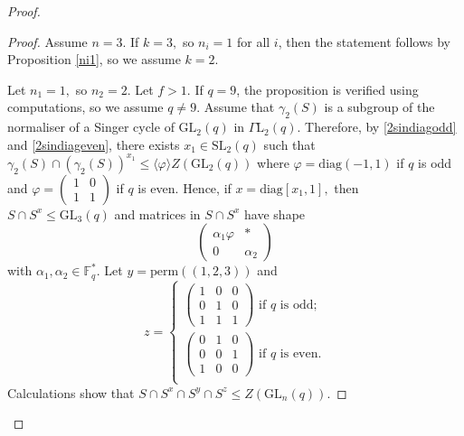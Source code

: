 \documentclass[a4paper,reqno,11pt]{amsart}
\theoremstyle{definition}
\theoremstyle{remark}
\numberwithin{equation}{section}
\newcommand{\diag}{\mathrm{diag}}
\newcommand{\per}{\mathrm{perm}}
\newcommand{\GaL}{{\Gamma \mathrm{L}}}
\newcommand{\SL}{{\mathrm{SL}}}
\newcommand{\GL}{{\mathrm{GL}}}
\begin{document}
\begin{proof}
\begin{proof}
Assume $n=3$.  If $k=3,$ so $n_i=1$ for all $i$, then the statement follows by Proposition \ref{ni1}, so we assume $k=2.$

Let $n_1=1,$ so $n_2=2.$ Let $f>1.$ If $q=9$, the proposition is verified using computations, so we assume $q\ne 9.$ Assume that $\gamma_2(S)$ is a subgroup of the normaliser of a Singer cycle of $\GL_2(q)$ in $\GaL_2(q).$ Therefore, by \eqref{2sindiagodd} and \eqref{2sindiageven}, there exists $x_1 \in \SL_2(q)$ such that $\gamma_2(S) \cap (\gamma_2(S))^{x_1} \le \langle \varphi \rangle Z(\GL_2(q))$ where $\varphi = \diag(-1,1)$ if $q$ is odd and $\varphi = \begin{pmatrix}
1 & 0\\
1 & 1
\end{pmatrix}$ if $q$ is even. Hence, if $x=\diag[x_1,1],$ then $S \cap S^x \le \GL_3(q)$ and matrices in $S \cap S^x$ have shape 
$$
 \begin{pmatrix}
\alpha_1 \varphi & *\\
0 & \alpha_2
\end{pmatrix}
$$ with $\alpha_1, \alpha_2 \in \mathbb{F}_q^*.$ Let $y=\per((1,2,3))$ and 
$$
z=
\begin{cases}
\begin{pmatrix}
1&0&0\\
0&1&0\\
1&1&1
\end{pmatrix} \text{ if $q$ is odd;}\\
\begin{pmatrix}
0&1&0\\
0&0&1\\
1&0&0
\end{pmatrix} \text{ if $q$ is even.}\\
\end{cases}
$$
Calculations show that $S \cap S^x \cap S^y \cap S^z \le Z(\GL_n(q)).$


\end{proof}
\end{proof}
\end{document}
